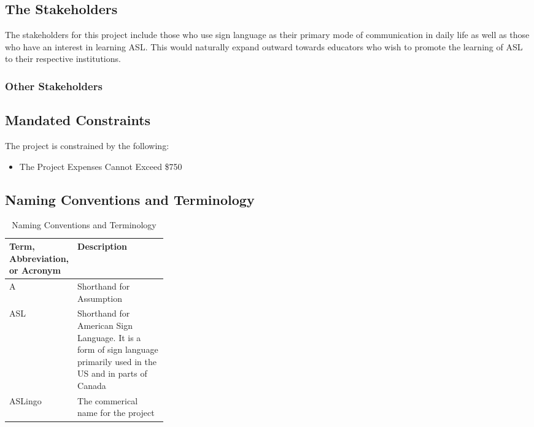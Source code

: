 \documentclass[12pt, titlepage]{article}
\begin{document}
\subsection{The Stakeholders}

 The stakeholders for this project include those who use sign language as their primary mode of communication in daily life as well as those who have an interest in learning ASL. This would naturally expand outward towards educators who wish to promote the learning of ASL to their respective institutions. 



\subsubsection{Other Stakeholders}

\subsection{Mandated Constraints}

The project is constrained by the following:

\begin{itemize}
    \item The Project Expenses Cannot Exceed \$750
\end{itemize}

\subsection{Naming Conventions and Terminology}

\begin{table}[H]
\caption{Naming Conventions and Terminology}
\noindent \begin{tabularx}{\textwidth}{|p{0.3\linewidth}|X|}
\toprule
\textbf{Term, Abbreviation, or Acronym} & \textbf{Description}\\
\midrule
A
& Shorthand for Assumption\\
\hline
ASL
& Shorthand for American Sign Language. It is a form of sign language primarily used in the US and in parts of Canada\\
\hline
ASLingo
& The commerical name for the project\\
\bottomrule
\end{tabularx}
\end{table}
\end{document}

